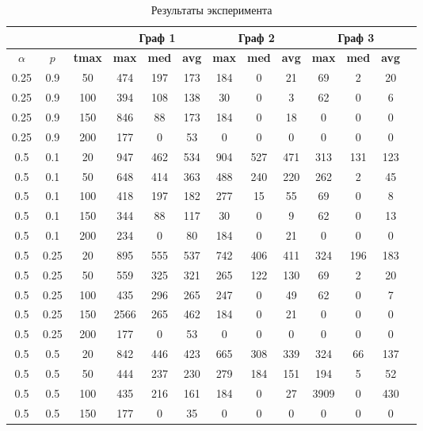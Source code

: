 \begin{table}[H]
\centering
\caption{Результаты эксперимента}
\begin{tabular}{|c|c|c|c|c|c|c|c|c|c|c|c|c|}
\hline
\multicolumn{3}{|c|}{} & \multicolumn{3}{|c|}{Граф 1} & \multicolumn{3}{|c|}{Граф 2} & \multicolumn{3}{|c|}{Граф 3} \\ \hline
\textbf{\boldmath$\alpha$} & \textbf{\boldmath$p$} & \textbf{tmax} & \textbf{max} & \textbf{med} & \textbf{avg} & \textbf{max} & \textbf{med} & \textbf{avg} & \textbf{max} & \textbf{med} & \textbf{avg} \\ \hline
0.25 & 0.9 & 50 & 474 & 197 & 173 & 184 & 0 & 21 & 69 & 2 & 20 \\ \hline
0.25 & 0.9 & 100 & 394 & 108 & 138 & 30 & 0 & 3 & 62 & 0 & 6 \\ \hline
0.25 & 0.9 & 150 & 846 & 88 & 173 & 184 & 0 & 18 & 0 & 0 & 0 \\ \hline
0.25 & 0.9 & 200 & 177 & 0 & 53 & 0 & 0 & 0 & 0 & 0 & 0 \\ \hline
0.5 & 0.1 & 20 & 947 & 462 & 534 & 904 & 527 & 471 & 313 & 131 & 123 \\ \hline
0.5 & 0.1 & 50 & 648 & 414 & 363 & 488 & 240 & 220 & 262 & 2 & 45 \\ \hline
0.5 & 0.1 & 100 & 418 & 197 & 182 & 277 & 15 & 55 & 69 & 0 & 8 \\ \hline
0.5 & 0.1 & 150 & 344 & 88 & 117 & 30 & 0 & 9 & 62 & 0 & 13 \\ \hline
0.5 & 0.1 & 200 & 234 & 0 & 80 & 184 & 0 & 21 & 0 & 0 & 0 \\ \hline
0.5 & 0.25 & 20 & 895 & 555 & 537 & 742 & 406 & 411 & 324 & 196 & 183 \\ \hline
0.5 & 0.25 & 50 & 559 & 325 & 321 & 265 & 122 & 130 & 69 & 2 & 20 \\ \hline
0.5 & 0.25 & 100 & 435 & 296 & 265 & 247 & 0 & 49 & 62 & 0 & 7 \\ \hline
0.5 & 0.25 & 150 & 2566 & 265 & 462 & 184 & 0 & 21 & 0 & 0 & 0 \\ \hline
0.5 & 0.25 & 200 & 177 & 0 & 53 & 0 & 0 & 0 & 0 & 0 & 0 \\ \hline
0.5 & 0.5 & 20 & 842 & 446 & 423 & 665 & 308 & 339 & 324 & 66 & 137 \\ \hline
0.5 & 0.5 & 50 & 444 & 237 & 230 & 279 & 184 & 151 & 194 & 5 & 52 \\ \hline
0.5 & 0.5 & 100 & 435 & 216 & 161 & 184 & 0 & 27 & 3909 & 0 & 430 \\ \hline
0.5 & 0.5 & 150 & 177 & 0 & 35 & 0 & 0 & 0 & 0 & 0 & 0 \\ \hline

\end{tabular}
\end{table}

